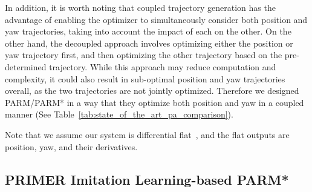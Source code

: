 \begin{figure}[t]
    \centering
    \resizebox{\columnwidth}{!}{
    
    } 
\label{fig:parm_sequence}
\end{figure}


In addition, it is worth noting that coupled trajectory generation has the advantage of enabling the optimizer to simultaneously consider both position and yaw trajectories, taking into account the impact of each on the other. On the other hand, the decoupled approach involves optimizing either the position or yaw trajectory first, and then optimizing the other trajectory based on the pre-determined trajectory. While this approach may reduce computation and complexity, it could also result in sub-optimal position and yaw trajectories overall, as the two trajectories are not jointly optimized. Therefore we designed PARM/PARM* in a way that they optimize both position and yaw in a coupled manner (See Table~\ref{tab:state_of_the_art_pa_comparison}). 

Note that we assume our system is differential flat~\cite{mellinger2011minimum}, and the flat outputs are position, yaw, and their derivatives.

\subsection{PRIMER \textemdash Imitation Learning-based PARM*}

